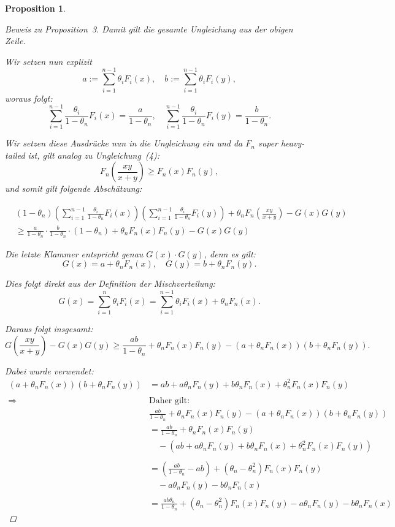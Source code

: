 \documentclass[
12pt,
fancyheadings, %
%
a4paper, 
%
]{tuhhreprt}
\newtheorem{proposition}[definition]{Proposition}
\begin{document}
\begin{proposition}
\begin{proof}[Beweis zu Proposition~3]
Damit gilt die gesamte Ungleichung aus der obigen Zeile.

Wir setzen nun explizit
\[
a := \sum_{i=1}^{n-1} \theta_i F_i(x), \quad
b := \sum_{i=1}^{n-1} \theta_i F_i(y),
\]
woraus folgt:
\[
\sum_{i=1}^{n-1} \frac{\theta_i}{1 - \theta_n} F_i(x) = \frac{a}{1 - \theta_n}, \quad
\sum_{i=1}^{n-1} \frac{\theta_i}{1 - \theta_n} F_i(y) = \frac{b}{1 - \theta_n}.
\]

Wir setzen diese Ausdrücke nun in die Ungleichung ein und da \( F_n \) super heavy-tailed ist, gilt analog zu Ungleichung~(4):
\[
F_n\left( \frac{xy}{x + y} \right) \geq F_n(x) F_n(y),
\]
und somit gilt folgende Abschätzung:

\begin{align*}
&(1 - \theta_n)
\left( \sum_{i=1}^{n-1} \frac{\theta_i}{1 - \theta_n} F_i(x) \right)
\left( \sum_{i=1}^{n-1} \frac{\theta_i}{1 - \theta_n} F_i(y) \right)
+ \theta_n F_n\left( \frac{xy}{x + y} \right) - G(x) G(y) \\
&\geq \frac{a}{1 - \theta_n} \cdot \frac{b}{1 - \theta_n} \cdot (1 - \theta_n)
+ \theta_n F_n(x) F_n(y) - G(x) G(y)
\end{align*}




Die letzte Klammer entspricht genau \( G(x) \cdot G(y) \), denn es gilt:
\[
G(x) = a + \theta_n F_n(x), \quad G(y) = b + \theta_n F_n(y).
\]

Dies folgt direkt aus der Definition der Mischverteilung:
\[
G(x) = \sum_{i=1}^n \theta_i F_i(x) = \sum_{i=1}^{n-1} \theta_i F_i(x) + \theta_n F_n(x).
\]

Daraus folgt insgesamt:
\[
G\left( \frac{xy}{x + y} \right) - G(x) G(y)
\geq \frac{ab}{1 - \theta_n} + \theta_n F_n(x) F_n(y) - (a + \theta_n F_n(x))(b + \theta_n F_n(y)).
\]

Dabei wurde verwendet:
\begin{align*}
(a + \theta_n F_n(x))(b + \theta_n F_n(y)) 
&= ab + a \theta_n F_n(y) + b \theta_n F_n(x) + \theta_n^2 F_n(x) F_n(y) \\
\\
\Rightarrow\quad
&\text{Daher gilt:} \\
&\frac{ab}{1 - \theta_n}
+ \theta_n F_n(x) F_n(y)
- (a + \theta_n F_n(x))(b + \theta_n F_n(y)) \\
&= \frac{ab}{1 - \theta_n}
+ \theta_n F_n(x) F_n(y) \\
&\quad - \left( ab + a \theta_n F_n(y) + b \theta_n F_n(x) + \theta_n^2 F_n(x) F_n(y) \right) \\
\\
&= \left( \frac{ab}{1 - \theta_n} - ab \right)
+ \left( \theta_n - \theta_n^2 \right) F_n(x) F_n(y) \\
&\quad - a \theta_n F_n(y)
- b \theta_n F_n(x) \\
\\
&= \frac{ab \theta_n}{1 - \theta_n}
+ (\theta_n - \theta_n^2) F_n(x) F_n(y)
- a \theta_n F_n(y)
- b \theta_n F_n(x)
\end{align*}


\end{proof}
\end{proposition}
\end{document}
